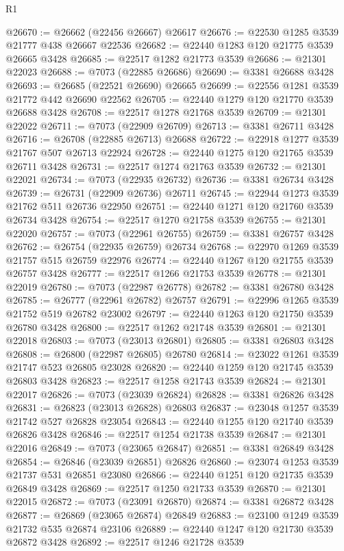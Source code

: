 \begin{lexlean}{R1}
\begin{coremodule}
@26670 := @26662 (@22456 @26667) @26617
@26676 := @22530 @1285 @3539 @21777 @438 @26667 @22536
@26682 := @22440 @1283 @120 @21775 @3539 @26665 @3428
@26685 := @22517 @1282 @21773 @3539
@26686 := @21301 @22023
@26688 := @7073 (@22885 @26686)
@26690 := @3381 @26688 @3428
@26693 := @26685 (@22521 @26690) @26665
@26699 := @22556 @1281 @3539 @21772 @442 @26690 @22562
@26705 := @22440 @1279 @120 @21770 @3539 @26688 @3428
@26708 := @22517 @1278 @21768 @3539
@26709 := @21301 @22022
@26711 := @7073 (@22909 @26709)
@26713 := @3381 @26711 @3428
@26716 := @26708 (@22885 @26713) @26688
@26722 := @22918 @1277 @3539 @21767 @507 @26713 @22924
@26728 := @22440 @1275 @120 @21765 @3539 @26711 @3428
@26731 := @22517 @1274 @21763 @3539
@26732 := @21301 @22021
@26734 := @7073 (@22935 @26732)
@26736 := @3381 @26734 @3428
@26739 := @26731 (@22909 @26736) @26711
@26745 := @22944 @1273 @3539 @21762 @511 @26736 @22950
@26751 := @22440 @1271 @120 @21760 @3539 @26734 @3428
@26754 := @22517 @1270 @21758 @3539
@26755 := @21301 @22020
@26757 := @7073 (@22961 @26755)
@26759 := @3381 @26757 @3428
@26762 := @26754 (@22935 @26759) @26734
@26768 := @22970 @1269 @3539 @21757 @515 @26759 @22976
@26774 := @22440 @1267 @120 @21755 @3539 @26757 @3428
@26777 := @22517 @1266 @21753 @3539
@26778 := @21301 @22019
@26780 := @7073 (@22987 @26778)
@26782 := @3381 @26780 @3428
@26785 := @26777 (@22961 @26782) @26757
@26791 := @22996 @1265 @3539 @21752 @519 @26782 @23002
@26797 := @22440 @1263 @120 @21750 @3539 @26780 @3428
@26800 := @22517 @1262 @21748 @3539
@26801 := @21301 @22018
@26803 := @7073 (@23013 @26801)
@26805 := @3381 @26803 @3428
@26808 := @26800 (@22987 @26805) @26780
@26814 := @23022 @1261 @3539 @21747 @523 @26805 @23028
@26820 := @22440 @1259 @120 @21745 @3539 @26803 @3428
@26823 := @22517 @1258 @21743 @3539
@26824 := @21301 @22017
@26826 := @7073 (@23039 @26824)
@26828 := @3381 @26826 @3428
@26831 := @26823 (@23013 @26828) @26803
@26837 := @23048 @1257 @3539 @21742 @527 @26828 @23054
@26843 := @22440 @1255 @120 @21740 @3539 @26826 @3428
@26846 := @22517 @1254 @21738 @3539
@26847 := @21301 @22016
@26849 := @7073 (@23065 @26847)
@26851 := @3381 @26849 @3428
@26854 := @26846 (@23039 @26851) @26826
@26860 := @23074 @1253 @3539 @21737 @531 @26851 @23080
@26866 := @22440 @1251 @120 @21735 @3539 @26849 @3428
@26869 := @22517 @1250 @21733 @3539
@26870 := @21301 @22015
@26872 := @7073 (@23091 @26870)
@26874 := @3381 @26872 @3428
@26877 := @26869 (@23065 @26874) @26849
@26883 := @23100 @1249 @3539 @21732 @535 @26874 @23106
@26889 := @22440 @1247 @120 @21730 @3539 @26872 @3428
@26892 := @22517 @1246 @21728 @3539

\end{coremodule}
\end{lexlean}
